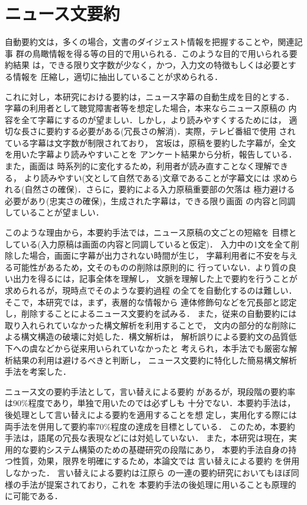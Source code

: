 \section{ニュース文要約}
\label{section:news}

自動要約文は，多くの場合，文書のダイジェスト情報を把握することや，関連記事
群の鳥瞰情報を得る等の目的で用いられる．このような目的で用いられる要約結果
は，できる限り文字数が少なく，かつ，入力文の特徴もしくは必要とする情報を
圧縮し，適切に抽出していることが求められる．

これに対し，本研究における要約は，ニュース字幕の自動生成を目的とする．
字幕の利用者として聴覚障害者等を想定した場合，本来ならニュース原稿の
内容を全て字幕にするのが望ましい．しかし，より読みやすくするためには，
適切な長さに要約する必要がある(冗長さの解消)．実際，テレビ番組で使用
されている字幕は文字数が制限されており\cite{WakaoAndEharaAndShirai1997}，
宮坂は，原稿を要約した字幕が，全文を用いた字幕より読みやすいことを
アンケート結果から分析，報告している\cite{Miyasaka1998}．また，画面は
時系列的に変化するため，利用者が読み直すことなく理解できる，
より読みやすい(文として自然である)文章であることが字幕文には
求められる(自然さの確保)．さらに，要約による入力原稿重要部の欠落は
極力避ける必要があり(忠実さの確保)，生成された字幕は，できる限り画面
の内容と同調していることが望ましい．

このような理由から，本要約手法では，ニュース原稿の文ごとの短縮を
目標としている(入力原稿は画面の内容と同調していると仮定)．
入力中の1文を全て削除した場合，画面に字幕が出力されない時間が生じ，
字幕利用者に不安を与える可能性があるため，文そのものの削除は原則的に
行っていない．より質の良い出力を得るには，記事全体を理解し，
文脈を理解した上で要約を行うことが求められるが，現時点でそのような要約過程
の全てを自動化するのは難しい．そこで，本研究では，まず，表層的な情報から
連体修飾句などを冗長部と認定し，削除することによるニュース文要約を試みる．
また，従来の自動要約には取り入れられていなかった構文解析を利用することで，
文内の部分的な削除による構文構造の破壊に対処した．構文解析は，
解析誤りによる要約文の品質低下への虞などから従来用いられていなかったと
考えられ，本手法でも厳密な解析結果の利用は避けるべきと判断し，
ニュース文要約に特化した簡易構文解析手法を考案した．

ニュース文の要約手法として，言い替えによる要約
\cite{YamasakiAndMikamiAndMasuyamaAndNakagawa98}
があるが，現段階の要約率は90\%程度であり，単独で用いたのでは必ずしも
十分でない．本要約手法は，後処理として言い替えによる要約を適用することを想
定し，実用化する際には両手法を併用して要約率70\%程度の達成を目標としている．
このため，本要約手法は，語尾の冗長な表現などには対処していない．
また，本研究は現在，実用的な要約システム構築のための基礎研究の段階にあり，
本要約手法自身の持つ性質，効果，限界を明確にするため，本論文では
言い替えによる要約\cite{YamasakiAndMikamiAndMasuyamaAndNakagawa98}
を併用しなかった．
言い替えによる要約は江原ら\cite{EharaAndSawamuraAndWakaoAndAbeAndShirai1997}
の一連の要約研究においてもほぼ同様の手法が提案されており，これを
本要約手法の後処理に用いることも原理的に可能である．

